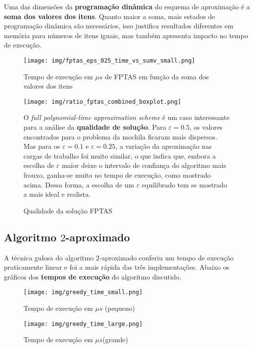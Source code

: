 \documentclass[12pt]{article}
\begin{document}
Uma das dimensões da \textbf{programação dinâmica} do esquema de aproximação é a \textbf{soma dos valores dos itens}. Quanto maior a soma, mais estados de programação dinâmica são necessários, isso justifica resultados diferentes em memória para números de itens iguais, mas também apresenta impacto no tempo de execução.

\begin{figure}[H]
    \centering
    \texttt{[image: img/fptas\_eps\_025\_time\_vs\_sumv\_small.png]}
    \caption{Tempo de execução em \(\mu s\) de FPTAS em função da soma dos valores dos itens}
    \label{fig:enter-label}
\end{figure}

\begin{figure}[H]
    \centering
    \begin{minipage}[c]{0.48\linewidth}
        \centering
        \texttt{[image: img/ratio\_fptas\_combined\_boxplot.png]}
        \caption{Qualidade da solução FPTAS}
        \label{fig:enter-label}
    \end{minipage}
    \hfill
    \begin{minipage}[c]{0.48\linewidth}
        O \textit{full polynomial-time approximation scheme} é um caso interessante para a análise da \textbf{qualidade de solução}. Para \(\varepsilon=0.5\), os valores encontrados para o problema da mochila ficaram mais dispersos. Mas para os \(\varepsilon=0.1\) e \(\varepsilon=0.25\), a variação da aproximação nas cargas de trabalho foi muito similar, o que indica que, embora a escolha de \(\varepsilon\) maior deixe o intervalo de confiança do algoritmo mais frouxo, ganha-se muito no tempo de execução, como mostrado acima. Dessa forma, a escolha de um \(\varepsilon\) equilibrado tem se mostrado a mais ideal e realista.
    \end{minipage}
\end{figure}


\subsection{Algoritmo \(2\)-aproximado}

A técnica gulosa do algoritmo \(2\)-aproximado conferiu um tempo de execução praticamente linear e foi a mais rápida das três implementações. Abaixo os gráficos dos \textbf{tempos de execução} do algoritmo discutido.


\begin{figure}[H]
    \centering
    \begin{minipage}[b]{0.48\linewidth}
        \centering
        \texttt{[image: img/greedy\_time\_small.png]}
        \caption{Tempo de execução em \(\mu s\) (pequeno)}
        \label{fig:fptas_small}
    \end{minipage}
    \hfill
    \begin{minipage}[b]{0.48\linewidth}
        \centering
        \texttt{[image: img/greedy\_time\_large.png]}
        \caption{Tempo de execução em \(\mu s\)(grande)}
        \label{fig:fptas_large}
    \end{minipage}
\end{figure}
\end{document}
